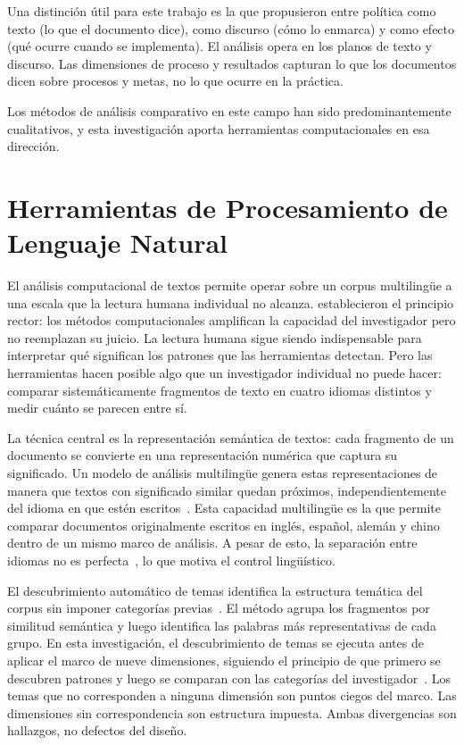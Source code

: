 Una distinción útil para este trabajo es la que propusieron \citet{rizvi2010globalizing} entre política como texto (lo que el documento dice), como discurso (cómo lo enmarca) y como efecto (qué ocurre cuando se implementa). El análisis opera en los planos de texto y discurso. Las dimensiones de proceso y resultados capturan lo que los documentos dicen sobre procesos y metas, no lo que ocurre en la práctica.

Los métodos de análisis comparativo en este campo han sido predominantemente cualitativos, y esta investigación aporta herramientas computacionales en esa dirección.


\section{Herramientas de Procesamiento de Lenguaje Natural}

El análisis computacional de textos permite operar sobre un corpus multilingüe a una escala que la lectura humana individual no alcanza. \citet{grimmer2013text} establecieron el principio rector: los métodos computacionales amplifican la capacidad del investigador pero no reemplazan su juicio. La lectura humana sigue siendo indispensable para interpretar qué significan los patrones que las herramientas detectan. Pero las herramientas hacen posible algo que un investigador individual no puede hacer: comparar sistemáticamente fragmentos de texto en cuatro idiomas distintos y medir cuánto se parecen entre sí.

La técnica central es la representación semántica de textos: cada fragmento de un documento se convierte en una representación numérica que captura su significado. Un modelo de análisis multilingüe genera estas representaciones de manera que textos con significado similar quedan próximos, independientemente del idioma en que estén escritos~\citep{reimers2019sentencebert}. Esta capacidad multilingüe es la que permite comparar documentos originalmente escritos en inglés, español, alemán y chino dentro de un mismo marco de análisis. A pesar de esto, la separación entre idiomas no es perfecta~\citep{conneau2020unsupervised}, lo que motiva el control lingüístico.

El descubrimiento automático de temas identifica la estructura temática del corpus sin imponer categorías previas~\citep{grootendorst2022bertopic}. El método agrupa los fragmentos por similitud semántica y luego identifica las palabras más representativas de cada grupo. En esta investigación, el descubrimiento de temas se ejecuta antes de aplicar el marco de nueve dimensiones, siguiendo el principio de que primero se descubren patrones y luego se comparan con las categorías del investigador~\citep{nelson2020computational}. Los temas que no corresponden a ninguna dimensión son puntos ciegos del marco. Las dimensiones sin correspondencia son estructura impuesta. Ambas divergencias son hallazgos, no defectos del diseño.

